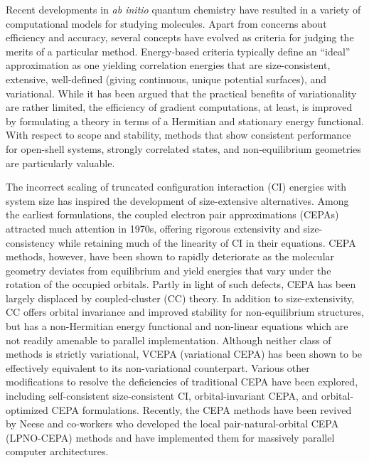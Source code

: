 Recent developments in {\itshape ab initio} quantum chemistry have resulted in a
variety of computational models for studying molecules.
Apart from concerns about efficiency and accuracy, several concepts have evolved
as criteria for judging the merits of a particular method.
Energy-based criteria typically define an ``ideal'' approximation as one
yielding correlation energies that are size-consistent,
extensive\cite{Nooijen:2005p2277},
well-defined (giving continuous, unique potential surfaces), and
variational.\cite{Pople:1976p1} 
While it has been argued that the practical benefits of variationality are
rather limited,\cite{Bartlett:1981p359} 
the efficiency of gradient computations, at least, is improved by formulating a
theory in terms of a Hermitian and stationary energy
functional.\cite{Szalay:1995p281}
With respect to scope and stability, methods that show consistent performance
for open-shell systems, strongly correlated states, and non-equilibrium
geometries are particularly valuable.\cite{Bartlett:1981p359}

The incorrect scaling of truncated configuration interaction (CI) energies with
system size has inspired the development of size-extensive alternatives. Among
the earliest formulations, the coupled electron pair approximations (CEPAs)
\cite{Kelly:1963p2091,Kelly:1964pA1450,Meyer:1973p1017,Ahlrichs:1979p31,Koch:1981p387}
attracted much attention in
1970s,\cite{Gelus:1970p503,Staemmler:1972p187,Ahlrichs:1975p1235,Kollmar:1977p3583,Wasilewski:1988p1289}
offering rigorous extensivity and size-consistency while retaining much of the
linearity\cite{Taube:2009p1441122} of CI in their equations.
CEPA methods, however, have been shown to rapidly deteriorate as the molecular
geometry deviates from equilibrium\cite{Taube:2009p1441122} and yield energies
that vary under the rotation of the occupied orbitals.\cite{Ahlrichs:1979p31}
Partly in light of such defects, CEPA has been largely displaced by
coupled-cluster (CC)
theory.\cite{Coester:1958p421,Coester:1960p477,Cizek:1966p4256,Bartlett:1978p561,Bartlett:1981p359,Crawford:2000p33,Bartlett:2007p291,Shavitt:2009}
In addition to size-extensivity, CC offers orbital invariance and improved
stability for non-equilibrium structures\cite{Taube:2009p1441122}, but has a
non-Hermitian energy functional and non-linear equations which are not readily
amenable to parallel implementation.
Although neither class of methods is strictly variational, VCEPA (variational
CEPA) has been shown to be effectively equivalent to its non-variational
counterpart.\cite{Kollmar:2010p2449}
Various other modifications to resolve the deficiencies of traditional CEPA have
been explored, including self-consistent size-consistent CI,
\cite{Daudey:1993p1240,Malrieu:2010p179} orbital-invariant CEPA,
\cite{Nooijen:2006p25,Kollmar:2011p084102} and orbital-optimized CEPA
formulations.
\cite{Kollmar:2010p311,Bozkaya:2013p054104,Soydas:2014p1073,Bozkaya:2013p154105}
Recently, the CEPA methods have been revived by Neese and
co-workers\cite{Wennmohs:2008p217,Neese:2009p114108,Kollmar:2010p2449} who
developed the local pair-natural-orbital CEPA (LPNO-CEPA) methods and have
implemented them for massively parallel computer architectures.

